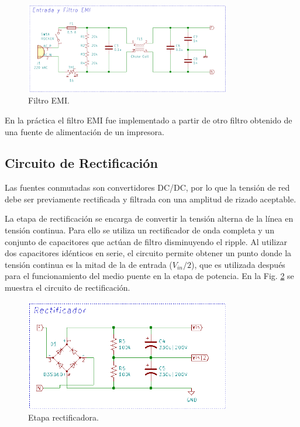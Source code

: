 \documentclass[11pt, a4paper]{article}
\begin{document}
\begin{figure}[h]
	\centering
	\includegraphics[width = 0.8\textwidth]{Imagenes/emi}
	\caption{Filtro EMI.}
	\label{emi}
\end{figure}

En la práctica el filtro EMI fue implementado a partir de otro filtro obtenido de una fuente de alimentación de un impresora.

\subsection{Circuito de Rectificación}
Las fuentes conmutadas son convertidores DC/DC, por lo que la tensión de red debe ser previamente rectificada y filtrada con una amplitud de rizado aceptable.

La etapa de rectificación se encarga de convertir la tensión alterna de la línea en tensión continua. Para ello se utiliza un rectificador de onda completa y un conjunto de capacitores que actúan de filtro disminuyendo el ripple. Al utilizar dos capacitores idénticos en serie, el circuito permite obtener un punto donde la tensión continua es la mitad de la de entrada ($V_{in}/2$), que es utilizada después para el funcionamiento del medio puente en la etapa de potencia. En la Fig. \ref{rectificador} se muestra el circuito de rectificación.

\begin{figure}[h]
	\centering
	\includegraphics[width = 0.8\textwidth]{Imagenes/rectificador}
	\caption{Etapa rectificadora.}
	\label{rectificador}
\end{figure}
\end{document}
